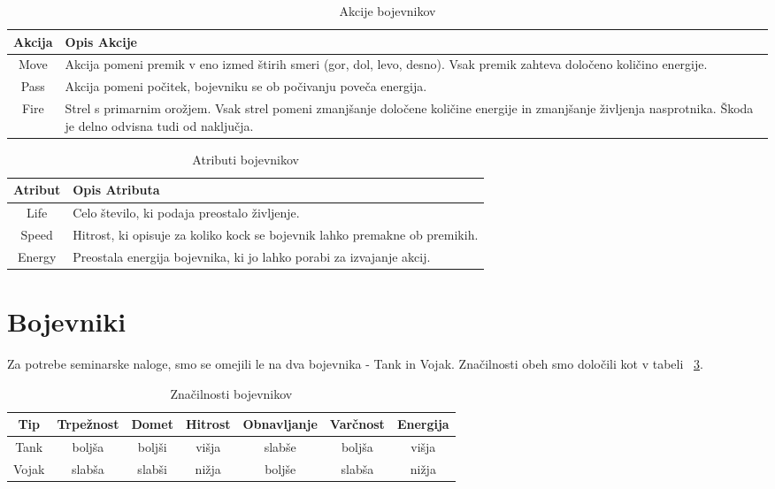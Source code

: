\documentclass[12pt,a4paper,openany]{book}
\begin{document}
\begin{table}[ht] 
\centering
\begin{tabular}{cp{10cm}}
\hline\hline
Akcija & Opis Akcije \\ [0.5ex]
\hline 
Move & Akcija pomeni premik v eno izmed štirih smeri (gor, dol, levo, desno). Vsak premik zahteva določeno količino energije.\\
Pass & Akcija pomeni počitek, bojevniku se ob počivanju poveča energija.\\
Fire & Strel s primarnim orožjem. Vsak strel pomeni zmanjšanje določene količine energije in zmanjšanje življenja nasprotnika. Škoda je delno odvisna tudi od naključja.\\ [1ex]
\hline %
\end{tabular}
\caption{Akcije bojevnikov}
\label{table:akcijeBojevnikov} %
\end{table}

\begin{table}[ht] 
\centering
\begin{tabular}{cp{10cm}}
\hline\hline
Atribut & Opis Atributa \\ [0.5ex]
\hline 
Life & Celo število, ki podaja preostalo življenje.\\
Speed & Hitrost, ki opisuje za koliko kock se bojevnik lahko premakne ob premikih.\\
Energy & Preostala energija bojevnika, ki jo lahko porabi za izvajanje akcij.\\ [1ex]
\hline %
\end{tabular}
\caption{Atributi bojevnikov}
\label{table:atributiBojevnikov} %
\end{table}

\section{Bojevniki}
Za potrebe seminarske naloge, smo se omejili le na dva bojevnika - Tank in Vojak. 
Značilnosti obeh smo določili kot v tabeli ~\ref{table:bojevniki}. 
\begin{table}[ht] 
\centering
\begin{tabular}{ccccccc}
\hline\hline
Tip & Trpežnost & Domet & Hitrost & Obnavljanje & Varčnost  & Energija \\ [0.5ex]
\hline 
Tank & boljša & boljši & višja & slabše & boljša & višja\\
Vojak & slabša & slabši & nižja & boljše & slabša & nižja\\ [1ex]
\hline %
\end{tabular}
\caption{Značilnosti bojevnikov}
\label{table:bojevniki} %
\end{table}
\end{document}
